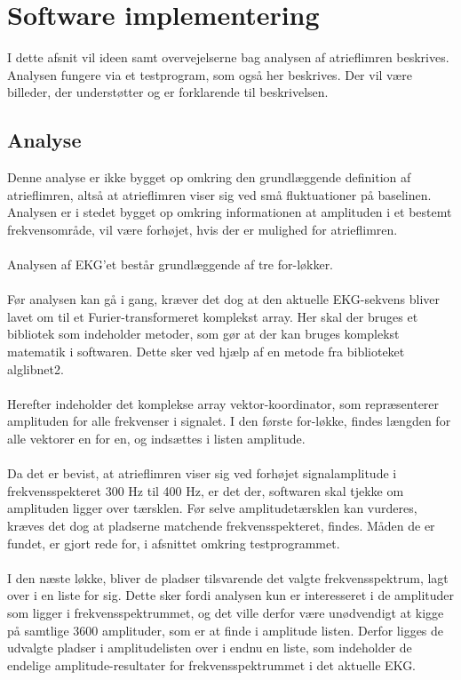 \section{Software implementering}
I dette afsnit vil ideen samt overvejelserne bag analysen af atrieflimren beskrives. Analysen fungere via et testprogram, som også her beskrives. Der vil være billeder, der understøtter og er forklarende til beskrivelsen. 

\subsection{Analyse}
Denne analyse er ikke bygget op omkring den grundlæggende definition af atrieflimren, altså at atrieflimren viser sig ved små fluktuationer på baselinen. Analysen er i stedet bygget op omkring informationen at amplituden i et bestemt frekvensområde, vil være forhøjet, hvis der er mulighed for atrieflimren. \\ \\
Analysen af EKG’et består grundlæggende af tre for-løkker. \\ \\
Før analysen kan gå i gang, kræver det dog at den aktuelle EKG-sekvens bliver lavet om til et Furier-transformeret komplekst array. Her skal der bruges et bibliotek som indeholder metoder, som gør at der kan bruges komplekst matematik i softwaren. Dette sker ved hjælp af en metode fra biblioteket alglibnet2. \\ \\
Herefter indeholder det komplekse array vektor-koordinator, som repræsenterer amplituden for alle frekvenser i signalet. I den første for-løkke, findes længden for alle vektorer en for en, og indsættes i listen amplitude. \\ \\
Da det er bevist, at atrieflimren viser sig ved forhøjet signalamplitude i frekvensspekteret 300 Hz til 400 Hz, er det der, softwaren skal tjekke om amplituden ligger over tærsklen. Før selve amplitudetærsklen kan vurderes, kræves det dog at pladserne matchende frekvensspekteret, findes. Måden de er fundet, er gjort rede for, i afsnittet omkring testprogrammet. \\ \\
I den næste løkke, bliver de pladser tilsvarende det valgte frekvensspektrum, lagt over i en liste for sig. Dette sker fordi analysen kun er interesseret i de amplituder som ligger i frekvensspektrummet, og det ville derfor være unødvendigt at kigge på samtlige 3600 amplituder, som er at finde i amplitude listen. Derfor ligges de udvalgte pladser i amplitudelisten over i endnu en liste, som indeholder de endelige amplitude-resultater for frekvensspektrummet i det aktuelle EKG. \\ \\
